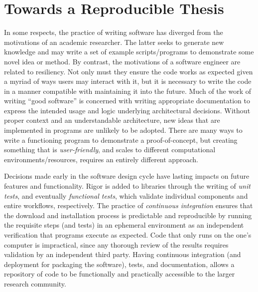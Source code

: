 \section{Towards a Reproducible Thesis}\label{sec:reproducibility}

In some respects, the practice of writing software has diverged from the motivations of an academic researcher.
The latter seeks to generate new knowledge and may write a set of example scripts/programs to demonstrate some novel idea or method.
By contrast, the motivations of a software engineer are related to resiliency.
Not only must they ensure the code works as expected given a myriad of ways users may interact with it, but it is necessary to write the code in a manner compatible with maintaining it into the future.
Much of the work of writing ``good software'' is concerned with writing appropriate documentation to express the intended usage and logic underlying architectural decisions.
Without proper context and an understandable architecture, new ideas that are implemented in programs are unlikely to be adopted.
There are many ways to write a functioning program to demonstrate a proof-of-concept, but creating something that is \emph{user-friendly}, and scales to different computational environments/resources, requires an entirely different approach.

Decisions made early in the software design cycle have lasting impacts on future features and functionality.
Rigor is added to libraries through the writing of \emph{unit tests}, and eventually \emph{functional tests}, which validate individual components and entire workflows, respectively.
The practice of \emph{continuous integration} ensures that the download and installation process is predictable and reproducible by running the requisite steps (and tests) in an ephemeral environment as an independent verification that programs execute as expected.
Code that only runs on the one's computer is impractical, since any thorough review of the results requires validation by an independent third party.
Having continuous integration (and deployment for packaging the software), tests, and documentation, allows a repository of code to be functionally and practically accessible to the larger research community.


